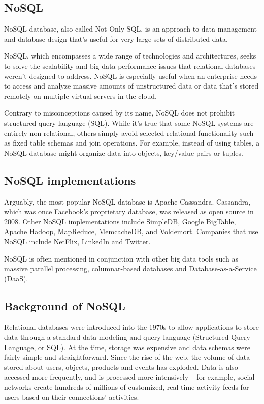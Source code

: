 \subsection{NoSQL}

NoSQL database, also called Not Only SQL, is an approach to data management and database design that's useful for very large sets of distributed data.  

NoSQL, which encompasses a wide range of technologies and architectures, seeks to solve the scalability and big data performance issues that relational databases weren’t designed to address. NoSQL is especially useful when an enterprise needs to access and analyze massive amounts of unstructured data or data that's stored remotely on multiple virtual servers in the cloud.   

Contrary to misconceptions caused by its name, NoSQL does not prohibit structured query language (SQL). While it's true that some NoSQL systems are entirely non-relational, others simply avoid selected relational functionality such as fixed table schemas and join operations. For example, instead of using tables, a NoSQL database might organize data into objects, key/value pairs or tuples.

\subsection{NoSQL implementations}
Arguably, the most popular NoSQL database is Apache Cassandra. Cassandra, which was once Facebook’s proprietary database, was released as open source in 2008. Other NoSQL implementations include SimpleDB, Google BigTable, Apache Hadoop, MapReduce, MemcacheDB, and Voldemort. Companies that use NoSQL include NetFlix, LinkedIn and Twitter.

NoSQL is often mentioned in conjunction with other big data tools such as massive parallel processing, columnar-based databases and Database-as-a-Service (DaaS).

\subsection{Background of NoSQL}
Relational databases were introduced into the 1970s to allow applications to store data through a standard data modeling and query language (Structured Query Language, or SQL). At the time, storage was expensive and data schemas were fairly simple and straightforward. Since the rise of the web, the volume of data stored about users, objects, products and events has exploded. Data is also accessed more frequently, and is processed more intensively – for example, social networks create hundreds of millions of customized, real-time activity feeds for users based on their connections' activities.

